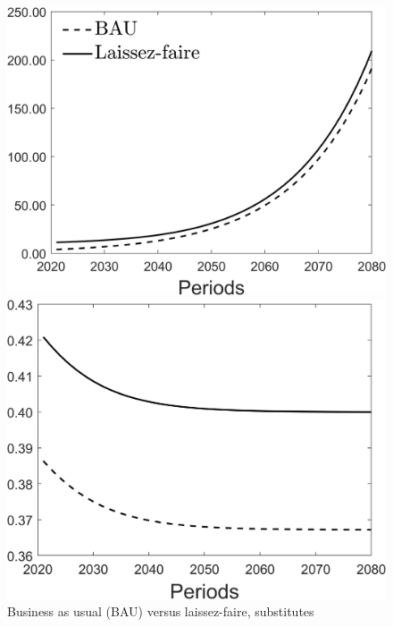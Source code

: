 \begin{figure}[h!!]
	\centering
	\caption{Business as usual (BAU) versus laissez-faire, substitutes }\label{fig:onlyBAU_subs}
	\begin{minipage}[]{0.32\textwidth}
		\includegraphics[width=1\textwidth]{../../codding_model/Own/figures/Rep_agent/staticBAU_LF_separate_c_periods59_eppsilon4.00_zeta1.40_Ad08_Ac04_thetac0.70_thetad0.56_HetGrowth1_tauul0.181_util0_withtarget0_lgd1.png}
	\end{minipage}
	\begin{minipage}[]{0.32\textwidth}
		\includegraphics[width=1\textwidth]{../../codding_model/Own/figures/Rep_agent/staticBAU_LF_separate_hh_periods59_eppsilon4.00_zeta1.40_Ad08_Ac04_thetac0.70_thetad0.56_HetGrowth1_tauul0.181_util0_withtarget0_lgd0.png}

\end{minipage}
\end{figure}
